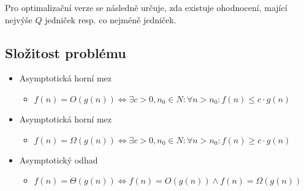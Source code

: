 Pro optimalizační verze se následně určuje, zda existuje ohodnocení, mající nejvýše $Q$ jedniček resp. co nejméně jedniček.

\subsection{Složitost problému}

\begin{itemize}
    \item Asymptotická horní mez
    \begin{itemize}
        \item $f(n) = O(g(n)) \Leftrightarrow \exists c > 0, n_0 \in N: \forall n > n_0: f(n) \leq c \cdot g(n)$
    \end{itemize}

    \item Asymptotická horní mez
    \begin{itemize}
        \item $f(n) = \Omega(g(n)) \Leftrightarrow \exists c > 0, n_0 \in N: \forall n > n_0: f(n) \geq c \cdot g(n)$
    \end{itemize}

    \item Asymptotický odhad
    \begin{itemize}
        \item $f(n) = \Theta(g(n)) \Leftrightarrow f(n) = O(g(n)) \land f(n) = \Omega(g(n))$
    \end{itemize}
\end{itemize}
